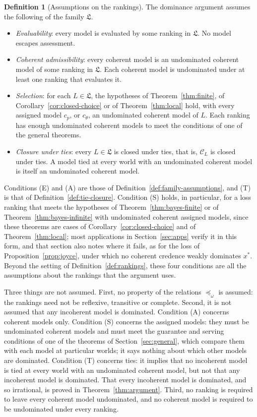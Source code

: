 \documentclass[11pt]{article}
\theoremstyle{definition}
\newtheorem{definition}[theorem]{Definition}
\theoremstyle{remark}
\newcommand{\C}{\mathcal C}
\newcommand{\Lf}{\mathfrak L}
\begin{document}
\begin{definition}[Assumptions on the rankings]\label{def:argument-assumptions}
The dominance argument assumes the following of the family $\Lf$.
\begin{itemize}[leftmargin=2.4em,labelsep=0.5em]
\item[\textbf{(E)}] \emph{Evaluability}: every model is evaluated by some ranking in $\Lf$. No model escapes assessment.
\item[\textbf{(A)}] \emph{Coherent admissibility}: every coherent model is an undominated coherent model of some ranking in $\Lf$. Each coherent model is undominated under at least one ranking that evaluates it.
\item[\textbf{(S)}] \emph{Selection}: for each $L\in\Lf$, the hypotheses of Theorem~\ref{thm:finite}, of Corollary~\ref{cor:closed-choice} or of Theorem~\ref{thm:local} hold, with every assigned model $c_p$, or $c_\theta$, an undominated coherent model of $L$. Each ranking has enough undominated coherent models to meet the conditions of one of the general theorems.
\item[\textbf{(T)}] \emph{Closure under ties}: every $L\in\Lf$ is closed under ties, that is, $\C_L$ is closed under ties. A model tied at every world with an undominated coherent model is itself an undominated coherent model.
\end{itemize}
\end{definition}

Conditions (E) and (A) are those of Definition~\ref{def:family-assumptions}, and (T) is that of Definition~\ref{def:tie-closure}. Condition (S) holds, in particular, for a loss ranking that meets the hypotheses of Theorem~\ref{thm:bayes-finite} or of Theorem~\ref{thm:bayes-infinite} with undominated coherent assigned models, since these theorems are cases of Corollary~\ref{cor:closed-choice} and of Theorem~\ref{thm:local}; most applications in Section~\ref{sec:apps} verify it in this form, and that section also notes where it fails, as for the loss of Proposition~\ref{prop:joyce}, under which no coherent credence weakly dominates $x^*$. Beyond the setting of Definition~\ref{def:rankings}, these four conditions are all the assumptions about the rankings that the argument uses.

Three things are not assumed. First, no property of the relations $\preceq_\omega$ is assumed: the rankings need not be reflexive, transitive or complete. Second, it is not assumed that any incoherent model is dominated. Condition (A) concerns coherent models only. Condition (S) concerns the assigned models: they must be undominated coherent models and must meet the guarantee and serving conditions of one of the theorems of Section~\ref{sec:general}, which compare them with each model at particular worlds; it says nothing about which other models are dominated. Condition (T) concerns ties: it implies that no incoherent model is tied at every world with an undominated coherent model, but not that any incoherent model is dominated. That every incoherent model is dominated, and so irrational, is proved in Theorem~\ref{thm:argument}. Third, no ranking is required to leave every coherent model undominated, and no coherent model is required to be undominated under every ranking.
\end{document}
